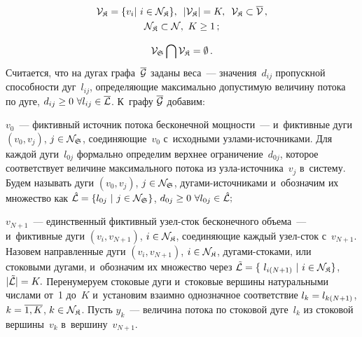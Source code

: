 \begin{multicols}{2}
\vspace*{-14pt}

\noindent
\begin{multline*}
{\cal V}_{\frak K} = \{v_i | \ i \in {\cal N}_{\frak K}\},\enskip  
|{\cal V}_{\frak K} | = K,\enskip {\cal V}_{\frak K} \subset \overline{{\cal V}}\,,
\\
{\cal N}_{\frak K} \subset {\cal N},\ K \geq 1\,;
\end{multline*}

\vspace*{-9pt}

\noindent
\begin{equation*}
{\cal V}_{\frak S} \bigcap {\cal V}_{\frak K} = \emptyset\,.
\end{equation*}
Считается, что на дугах графа~$\overline {\cal G}$ заданы веса~--- значения~$d_{ij}$ 
пропускной способности дуг~$l_{ij}$, определяющие максимально допустимую величину 
потока  по дуге,
$ d_{ij} \hm\geq 0 \ \forall l_{ij}\hm\in \overline{\cal L}$.
К~графу $\overline {\cal G}$ добавим:
\begin{description}
\item 

$v_0$~---  фиктивный источник потока бесконечной мощности~--- 
и~фиктивные дуги $(v_0, v_j)$,  $j \in {\cal N}_{\frak S}$, 
соединяющие~$v_0$ с~исходными уз\-ла\-ми-ис\-точ\-никами. 
Для каждой дуги~$l_{0j}$ формально определим верхнее ограничение~$d_{0j}$, 
которое соответствует величине максимального потока из уз\-ла-ис\-точ\-ни\-ка~$v_j$ 
в~сис\-те\-му. Будем называть  дуги $(v_0, v_j)$, $j \hm\in {\cal N}_\SS$,  
ду\-га\-ми-ис\-точ\-ни\-ка\-ми и~обозначим их множество как
$ \hat{{\cal L}}\hm=\{l_{0 j} \ | \  j \in {\cal N}_\SS \}$,  $d_{0j} \hm\geq 0 \ 
\forall l_{0 j} \hm\in \hat{{\cal L}}; $
\item 
$v_{N+1}$~--- единственный фиктивный узел-сток бесконечного объема~--- 
и~фиктивные дуги $(v_i, v_{N+1})$, $i \hm\in {\cal N}_\SK$, соединяющие 
каждый узел-сток с~$v_{N+1}$. Назовем направленные дуги $(v_i, v_{N+1})$, 
$i \hm\in {\cal N}_\SK$,  ду\-га\-ми-сто\-ка\-ми, или стоковыми дугами, 
и~обозначим их множество через
$\tilde{{\cal L}}\hm=\{\ l_{i(N + 1)} \ | \ i \hm \in {\cal N}_\SK\}$, 
$|\tilde{{\cal L}}| \hm=  K.$
Перенумеруем стоковые дуги и~стоковые вершины натуральными числами от~1 до~$K$ 
и~установим взаимно однозначное  соответствие $l_{k} \hm= l _{k (N+1)}$, 
$k \hm= \overline{1, K}$, $k \hm\in {\cal N}_\SK$.
Пусть $y_{k}$~--- величина потока по стоковой дуге~$l_{k}$ из стоковой вершины~$v_k$ 
в~вершину~$v_{N+1}$.
\end{description}


\end{multicols}
